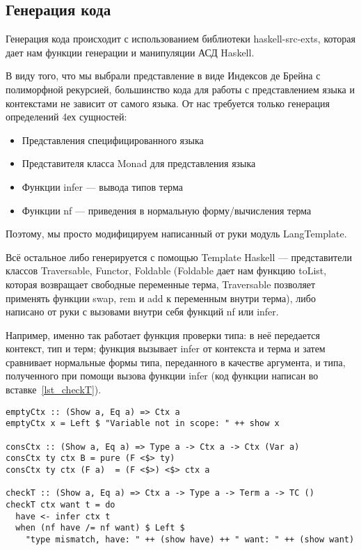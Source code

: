 \subsection{Генерация кода}
Генерация кода происходит с использованием библиотеки haskell-src-exts\cite{src_exts}, которая дает нам функции генерации и манипуляции АСД Haskell.

В виду того, что мы выбрали представление в виде Индексов де Брейна с полиморфной рекурсией, большинство кода для работы с представлением языка и контекстами не зависит от самого языка. От нас требуется только генерация определений 4ех сущностей:
\begin{itemize}
\item Представления специфицированного языка
\item Представителя класса Monad для представления языка
\item Функции infer --- вывода типов терма
\item Функции nf --- приведения в нормальную форму/вычисления терма
\end{itemize}

Поэтому, мы просто модифицируем написанный от руки модуль LangTemplate.

Всё остальное либо генерируется с помощью Template Haskell\cite{TH} --- представители классов Traversable\cite{deriveFun}, Functor, Foldable (Foldable дает нам функцию toList, которая возвращает свободные переменные терма, Traversable позволяет применять функции swap, rem и add к переменным внутри терма), либо написано от руки с вызовами внутри себя функций nf или infer.

Например, именно так работает функция проверки типа: в неё передается контекст, тип и терм; функция вызывает infer от контекста и терма и затем сравнивает нормальные формы типа, переданного в качестве аргумента, и типа, полученного при помощи вызова функции infer (код функции написан во вставке~\ref{lst_checkT}).

\begin{lstlisting}[caption={Проверка типов и контексты},captionpos=b, frame=single, float,floatplacement=H, label={lst_checkT}]
emptyCtx :: (Show a, Eq a) => Ctx a
emptyCtx x = Left $ "Variable not in scope: " ++ show x

consCtx :: (Show a, Eq a) => Type a -> Ctx a -> Ctx (Var a)
consCtx ty ctx B = pure (F <$> ty)
consCtx ty ctx (F a)  = (F <$>) <$> ctx a

checkT :: (Show a, Eq a) => Ctx a -> Type a -> Term a -> TC ()
checkT ctx want t = do
  have <- infer ctx t
  when (nf have /= nf want) $ Left $
    "type mismatch, have: " ++ (show have) ++ " want: " ++ (show want)
\end{lstlisting}

